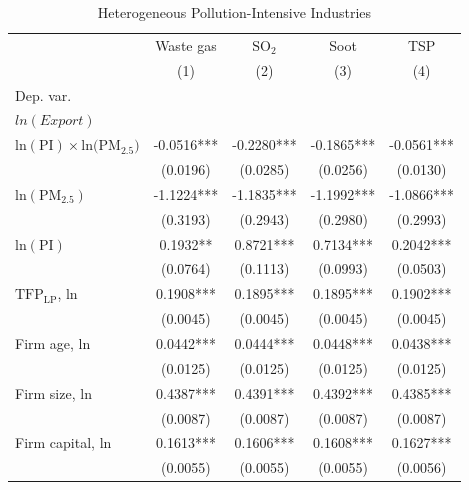 \documentclass[12pt]{article}
\begin{document}
    \begin{table}[H]\centering
      \footnotesize
      \caption{Heterogeneous Pollution-Intensive Industries}\label{tab:hetero_PI}
      \begin{tabular}{l*{4}{c}}
        \hline\hline
        &\multicolumn{1}{c}{Waste gas}&\multicolumn{1}{c}{$\mathrm{SO_{2}}$}&\multicolumn{1}{c}{Soot}&\multicolumn{1}{c}{TSP}\\
        &\multicolumn{1}{c}{(1)}&\multicolumn{1}{c}{(2)}&\multicolumn{1}{c}{(3)}&\multicolumn{1}{c}{(4)}\\
        Dep. var. &&&&\\
        $ln(Export)$ &&&&\\
        \hline
        $\mathrm{ln(PI) \times ln(PM_{2.5}})$ &-0.0516*** &-0.2280***  &-0.1865*** &-0.0561***\\
                                              &(0.0196)   &(0.0285)    &(0.0256)   &(0.0130)\\
        $\mathrm{ln(PM_{2.5})}$               &-1.1224*** &-1.1835***  &-1.1992*** &-1.0866***\\
                                              &(0.3193)   &(0.2943)    &(0.2980)   &(0.2993)\\  
        $\mathrm{ln(PI)}$                     &0.1932**   &0.8721***   &0.7134***  &0.2042***\\ 
                                              &(0.0764)   &(0.1113)    &(0.0993)   &(0.0503)\\   
        $\mathrm{TFP_{LP}}$, ln               &0.1908***  &0.1895***   &0.1895***  &0.1902***\\
                                              &(0.0045)   &(0.0045)    &(0.0045)   &(0.0045)\\
        Firm age, ln                          &0.0442***  &0.0444***   &0.0448***  &0.0438***\\
                                              &(0.0125)   &(0.0125)    &(0.0125)   &(0.0125)\\        
        Firm size, ln                         &0.4387***  &0.4391***   &0.4392***  &0.4385***\\
                                              &(0.0087)   &(0.0087)    &(0.0087)   &(0.0087)\\
        Firm capital, ln                      &0.1613***  &0.1606***   &0.1608***  &0.1627***\\
                                              &(0.0055)   &(0.0055)    &(0.0055)   &(0.0056)\\

\end{tabular}
\end{table}
\end{document}
